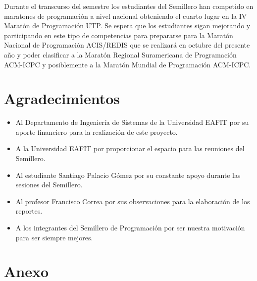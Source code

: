 \documentclass[conference]{IEEEtran}
\begin{document}
Durante el transcurso del semestre los estudiantes del Semillero han competido en maratones de programación a nivel nacional obteniendo el cuarto lugar en la IV Maratón de Programación UTP. Se espera que los estudiantes sigan mejorando y participando en este tipo de competencias para prepararse para la Maratón Nacional de Programación ACIS/REDIS que se realizará en octubre del presente año y poder clasificar a la Maratón Regional Suramericana de Programación ACM-ICPC y posiblemente a la Maratón Mundial de Programación ACM-ICPC.\\

\section{Agradecimientos}
\begin{itemize}
	\item Al Departamento de Ingeniería de Sistemas de la Universidad EAFIT por su aporte financiero para la realización de este proyecto.
	\item A la Universidad EAFIT por proporcionar el espacio para las reuniones del Semillero.
	\item Al estudiante Santiago Palacio Gómez por su constante apoyo durante las sesiones del Semillero.
	\item Al profesor Francisco Correa por sus observaciones para la elaboración de los reportes.
	\item A los integrantes del Semillero de Programación por ser nuestra motivación para ser siempre mejores.
\end{itemize}

\nocite{*}




\section*{Anexo}
\end{document}
